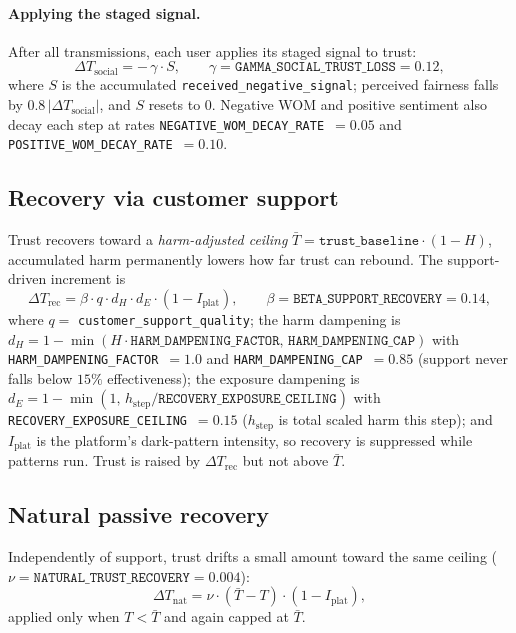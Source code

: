 \documentclass[11pt]{article}
\newcommand{\code}[1]{\texttt{#1}}
\begin{document}
\paragraph{Applying the staged signal.}
After all transmissions, each user applies its staged signal to trust:
\[
\Delta T_{\text{social}} = -\,\gamma \cdot S,
\qquad \gamma = \code{GAMMA\_SOCIAL\_TRUST\_LOSS} = 0.12,
\]
where $S$ is the accumulated \code{received\_negative\_signal}; perceived fairness
falls by $0.8\,|\Delta T_{\text{social}}|$, and $S$ resets to $0$. Negative WOM
and positive sentiment also decay each step at rates
\code{NEGATIVE\_WOM\_DECAY\_RATE}~$=0.05$ and
\code{POSITIVE\_WOM\_DECAY\_RATE}~$=0.10$.

\subsection{Recovery via customer support}
\label{sub:recovery}

Trust recovers toward a \emph{harm-adjusted ceiling}
$\bar T = \code{trust\_baseline}\cdot(1-H)$, accumulated harm permanently lowers
how far trust can rebound. The support-driven increment is
\[
\Delta T_{\text{rec}} = \beta \cdot q \cdot d_H \cdot d_E \cdot (1 - I_{\text{plat}}),
\qquad \beta = \code{BETA\_SUPPORT\_RECOVERY} = 0.14,
\]
where $q = $ \code{customer\_support\_quality}; the harm dampening is
$d_H = 1 - \min(H\cdot\code{HARM\_DAMPENING\_FACTOR},\,\code{HARM\_DAMPENING\_CAP})$
with \code{HARM\_DAMPENING\_FACTOR}~$=1.0$ and \code{HARM\_DAMPENING\_CAP}~$=0.85$
(support never falls below $15\%$ effectiveness); the exposure dampening is
$d_E = 1 - \min(1,\, h_{\text{step}}/\code{RECOVERY\_EXPOSURE\_CEILING})$ with
\code{RECOVERY\_EXPOSURE\_CEILING}~$=0.15$ ($h_{\text{step}}$ is total scaled harm
this step); and $I_{\text{plat}}$ is the platform's dark-pattern intensity, so
recovery is suppressed while patterns run. Trust is raised by
$\Delta T_{\text{rec}}$ but not above $\bar T$.

\subsection{Natural passive recovery}
\label{sub:natrecovery}

Independently of support, trust drifts a small amount toward the same ceiling
($\nu = \code{NATURAL\_TRUST\_RECOVERY} = 0.004$):
\[
\Delta T_{\text{nat}} = \nu\cdot(\bar T - T)\cdot(1 - I_{\text{plat}}),
\]
applied only when $T < \bar T$ and again capped at $\bar T$.
\end{document}
